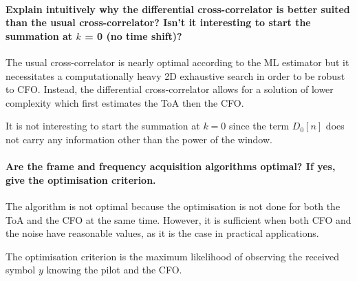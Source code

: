 \paragraph{Explain intuitively why the differential cross-correlator is better suited than the usual cross-correlator? Isn’t it interesting to start the summation at $k$ = 0 (no time shift)?} \mbox{}

The usual cross-correlator is nearly optimal according to the ML estimator but it necessitates a computationally heavy 2D exhaustive search in order to be robust to CFO. Instead, the differential cross-correlator allows for a solution of lower complexity which first estimates the ToA then the CFO.

It is not interesting to start the summation at $k=0$ since the term $D_0 \left[ n \right]$ does not carry any information other than the power of the window.

\newpage

\paragraph{Are the frame and frequency acquisition algorithms optimal? If yes, give the optimisation criterion.} \mbox{}

The algorithm is not optimal because the optimisation is not done for both the ToA and the CFO at the same time. However, it is sufficient when both CFO and the noise have reasonable values, as it is the case in practical applications.

The optimisation criterion is the maximum likelihood of observing the received symbol $y$ knowing the pilot and the CFO.